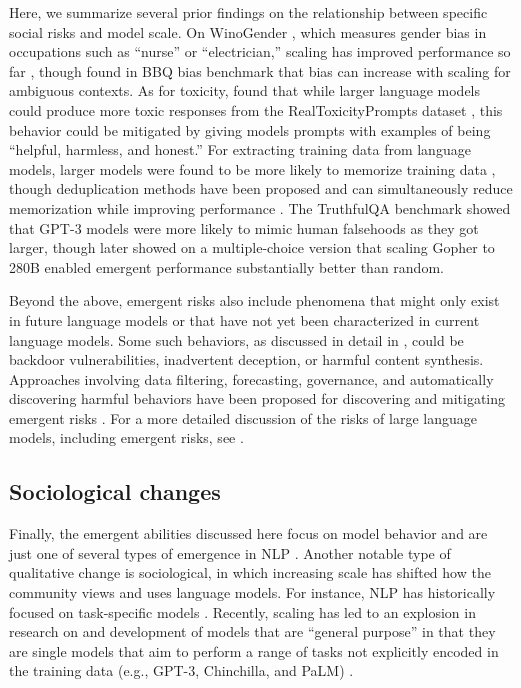 Here, we summarize several prior findings on the relationship between specific social risks and model scale. On WinoGender \citep{rudinger-etal-2017-social}, which measures gender bias in occupations such as ``nurse'' or ``electrician,'' scaling has improved performance so far \citep{du2021glam,chowdhery2022palm}, though \citet{bigbench} found in BBQ bias benchmark \citep{parrish-etal-2022-bbq} that bias can increase with scaling for ambiguous contexts. As for toxicity, \citet{askell2021general} found that while larger language models could produce more toxic responses from the RealToxicityPrompts dataset \citep{gehman-etal-2020-realtoxicityprompts}, this behavior could be mitigated by giving models prompts with examples of being ``helpful, harmless, and honest.'' For extracting training data from language models, larger models were found to be more likely to memorize training data \citep{carlini2021extracting,carlini2022quantifying}, though deduplication methods have been proposed and can simultaneously reduce memorization while improving performance \citep{kandpal2022deduplicating,lee2021deduplicating}. The TruthfulQA benchmark \citep{lin2021truthfulqa} showed that GPT-3 models were more likely to mimic human falsehoods as they got larger, though \citet{rae2021scaling} later showed on a multiple-choice version that scaling Gopher to 280B enabled emergent performance substantially better than random.

Beyond the above, emergent risks also include phenomena that might only exist in future language models or that have not yet been characterized in current language models. Some such behaviors, as discussed in detail in \citet{hendrycks2021unsolved}, could be backdoor vulnerabilities, inadvertent deception, or harmful content synthesis. Approaches involving data filtering, forecasting, governance, and automatically discovering harmful behaviors have been proposed for discovering and mitigating emergent risks \citep[][\textit{inter alia}]{bender2021dangers,weidinger2021ethical,jacobsrisks,ganguli2022predictability,perez2022red}. For a more detailed discussion of the risks of large language models, including emergent risks, see \citet{bender2021dangers,jacobsrisks,bommasani2021opportunities,ganguli2022predictability}.

\subsection{Sociological changes} Finally, the emergent abilities discussed here focus on model behavior and are just one of several types of emergence in NLP \citep{manning2020emergent,teehan2022emergent}. Another notable type of qualitative change is sociological, in which increasing scale has shifted how the community views and uses language models. For instance, NLP has historically focused on task-specific models \citep{jurafsky2009speech}. Recently, scaling has led to an explosion in research on and development of models that are ``general purpose'' in that they are single models that aim to perform a range of tasks not explicitly encoded in the training data (e.g., GPT-3, Chinchilla, and PaLM) \citep{manning2022human}.

